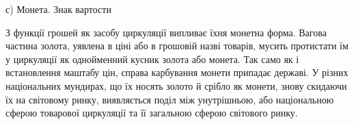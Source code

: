 с) Монета. Знак вартости

З функції грошей як засобу циркуляції випливає їхня монетна
форма. Вагова частина золота, уявлена в ціні або в грошовій
назві товарів, мусить протистати їм у циркуляції як однойменний
кусник золота або монета. Так само як і встановлення маштабу
цін, справа карбування монети припадає державі. У різних національних
мундирах, що їх носять золото й срібло як монети,
знову скидаючи їх на світовому ринку, виявляється поділ між
унутрішньою, або національною сферою товарової циркуляції
та її загальною сферою світового ринку.